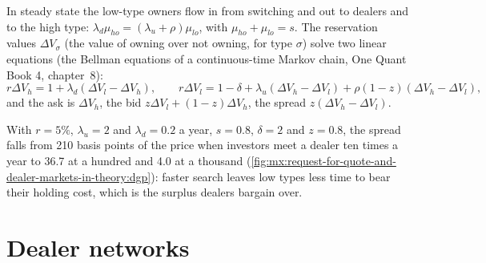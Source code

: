 In steady state the low-type owners flow in from switching and out to dealers and to the high type: $\lambda_d\mu_{ho}=(\lambda_u+\rho)\mu_{lo}$,
with $\mu_{ho}+\mu_{lo}=s$. The reservation values $\Delta V_\sigma$ (the value of owning over not owning, for type $\sigma$) solve two linear
equations (the Bellman equations of a continuous-time Markov chain, One Quant Book 4, chapter~8):
\[
r\Delta V_h=1+\lambda_d(\Delta V_l-\Delta V_h),\qquad r\Delta V_l=1-\delta+\lambda_u(\Delta V_h-\Delta V_l)+\rho(1-z)(\Delta V_h-\Delta V_l),
\]
and the ask is $\Delta V_h$, the bid $z\Delta V_l+(1-z)\Delta V_h$, the spread $z(\Delta V_h-\Delta V_l)$.

\label{lst:mx:request-for-quote-and-dealer-markets-in-theory:dgp}

With $r=5\%$, $\lambda_u=2$ and $\lambda_d=0.2$ a year, $s=0.8$, $\delta=2$ and $z=0.8$, the spread falls from 210 basis points of the price when
investors meet a dealer ten times a year to 36.7 at a hundred and 4.0 at a thousand (\cref{fig:mx:request-for-quote-and-dealer-markets-in-theory:dgp}):
faster search leaves low types less time to bear their holding cost, which is the surplus dealers bargain over.

\begin{omfigure}

\label{fig:mx:request-for-quote-and-dealer-markets-in-theory:dgp}
\end{omfigure}

\section{Dealer networks}

